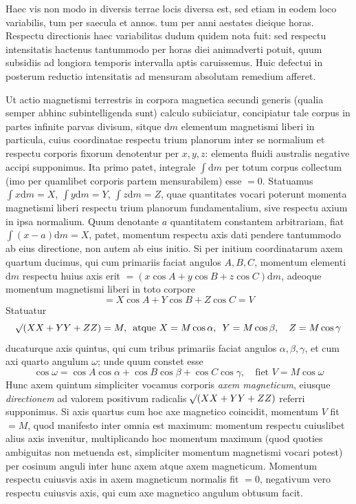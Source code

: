 Haec vis non modo in diversis terrae locis diversa est, sed etiam in eodem loco variabilis, tum per saecula et annos. tum per anni aestates dieique horas. Respectu directionis haec variabilitas dudum quidem nota fuit: sed respectu intensitatis hactenus tantummodo per horas diei animadverti potuit, quum subsidiis ad longiora temporis intervalla aptis caruissemus. Huic defectui in posterum reductio intensitatis ad mensuram absolutam remedium afferet.

Ut actio magnetismi terrestris in corpora magnetica secundi generis (qualia semper abhinc subintelligenda sunt) calculo subiiciatur, concipiatur tale corpus in partes infinite parvas divisum, sitque $\mathrm{d}m$ elementum magnetismi liberi in particula, cuius coordinatae respectu trium planorum inter se normalium et respectu corporis fixorum denotentur per $x,y,z$: elementa fluidi australis negative accipi supponimus. Ita primo patet, integrale $\int\mathrm{d}m$ per totum corpus collectum (imo per quamlibet corporis partem mensurabilem) esse $=0$. Statuamus $\int x\mathrm{d}m=X$, $\int y\mathrm{d}m=Y$, $\int z\mathrm{d}m=Z$, quae quantitates vocari poterunt momenta magnetismi liberi respectu trium planorum fundamentalium, sive respectu axium in ipsa normalium. Quum denotante $a$ quantitatem constantem arbitrariam, fiat $\int(x-a)\mathrm{d}m=X$, patet, momentum respectu axis dati pendere tantummodo ab eius directione, non autem ab eius initio. Si per initium coordinatarum axem quartum ducimus, qui cum primariis faciat angulos $A,B,C$, momentum elementi $\mathrm{d}m$ respectu huius axis erit $=(x\cos A+y\cos B+z\cos C)\mathrm{d}m$, adeoque momentum magnetismi liberi in toto corpore
\[
=X\cos A+Y\cos B+Z\cos C=V
\]
Statuatur
\[
\mathord{{}^{}\!\surd}(XX+YY+ZZ)=M,\enspace\text{atque }X=M\cos\alpha,\enspace Y=M\cos\beta,\quad Z=M\cos\gamma
\]
ducaturque axis quintus, qui cum tribus primariis faciat angulos $\alpha,\beta,\gamma$, et cum axi quarto angulum $\omega$; unde quum constet esse
\[
\cos\omega=\cos A\cos\alpha+\cos B\cos\beta+\cos C\cos\gamma,\quad\text{fiet }V=M\cos\omega
\]
Hunc axem quintum simpliciter vocamus corporis \textit{axem magneticum}, eiusque \textit{directionem} ad valorem positivum radicalis $\mathord{{}^{}\!\surd}(XX+YY+ZZ)$ referri supponimus. Si axis quartus cum hoc axe magnetico coincidit, momentum $V$ fit $=M$, quod manifesto inter omnia est maximum: momentum respectu cuiuslibet alius axis invenitur, multiplicando hoc momentum maximum (quod quoties ambiguitas non metuenda est, simpliciter momentum magnetismi vocari potest) per cosinum anguli inter hunc axem atque axem magneticum. Momentum respectu cuiusvis axis in axem magneticum normalis fit $=0$, negativum vero respectu cuiusvis axis, qui cum axe magnetico angulum obtusum facit.


